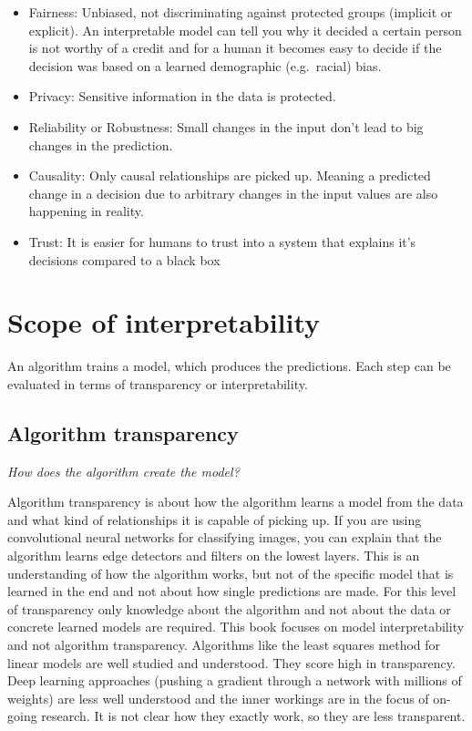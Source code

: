 \documentclass[12pt,]{krantz}
\providecommand{\tightlist}{%
  \setlength{\itemsep}{0pt}\setlength{\parskip}{0pt}}
\theoremstyle{definition}
\theoremstyle{definition}
\theoremstyle{definition}
\theoremstyle{remark}
\begin{document}
\begin{itemize}
\tightlist
\item
  Fairness: Unbiased, not discriminating against protected groups
  (implicit or explicit). An interpretable model can tell you why it
  decided a certain person is not worthy of a credit and for a human it
  becomes easy to decide if the decision was based on a learned
  demographic (e.g.~racial) bias.
\item
  Privacy: Sensitive information in the data is protected.
\item
  Reliability or Robustness: Small changes in the input don't lead to
  big changes in the prediction.
\item
  Causality: Only causal relationships are picked up. Meaning a
  predicted change in a decision due to arbitrary changes in the input
  values are also happening in reality.
\item
  Trust: It is easier for humans to trust into a system that explains
  it's decisions compared to a black box
\end{itemize}

\section{Scope of interpretability}\label{scope-of-interpretability}

An algorithm trains a model, which produces the predictions. Each step
can be evaluated in terms of transparency or interpretability.

\subsection{Algorithm transparency}\label{algorithm-transparency}

\emph{How does the algorithm create the model?}

Algorithm transparency is about how the algorithm learns a model from
the data and what kind of relationships it is capable of picking up. If
you are using convolutional neural networks for classifying images, you
can explain that the algorithm learns edge detectors and filters on the
lowest layers. This is an understanding of how the algorithm works, but
not of the specific model that is learned in the end and not about how
single predictions are made. For this level of transparency only
knowledge about the algorithm and not about the data or concrete learned
models are required. This book focuses on model interpretability and not
algorithm transparency. Algorithms like the least squares method for
linear models are well studied and understood. They score high in
transparency. Deep learning approaches (pushing a gradient through a
network with millions of weights) are less well understood and the inner
workings are in the focus of on-going research. It is not clear how they
exactly work, so they are less transparent.
\end{document}
